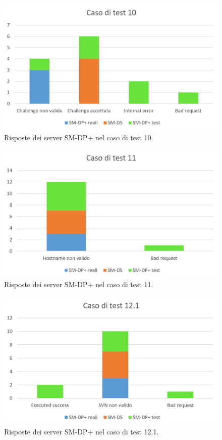 \documentclass[10pt, oneside]{book}
\begin{document}
\begin{figure}
\includegraphics[width=\linewidth]{test-10.png}
\caption{Risposte dei server SM-DP+ nel caso di test 10.}
\label{fig:test-10}
\end{figure}
\begin{figure}
\includegraphics[width=\linewidth]{test-11.png}
\caption{Risposte dei server SM-DP+ nel caso di test 11.}
\label{fig:test-11}
\end{figure}
\begin{figure}
\includegraphics[width=\linewidth]{test-12-1.png}
\caption{Risposte dei server SM-DP+ nel caso di test 12.1.}
\label{fig:test-12-1}
\end{figure}
\end{document}
